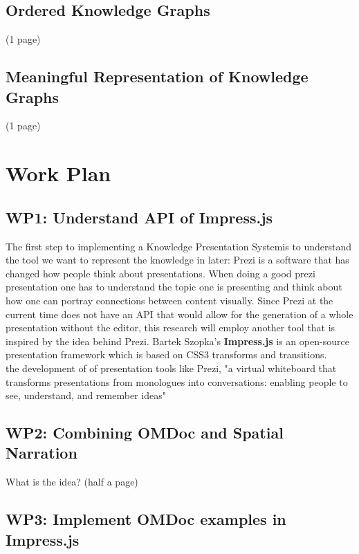 \documentclass[twoside]{article}
\newcommand{\sys}{Knowledge Presentation System}
\begin{document}
\subsection{Ordered Knowledge Graphs}
(1 page)
\newpage

\subsection{Meaningful Representation of Knowledge Graphs}
(1 page)

\newpage

\section{Work Plan}
\subsection{WP1: Understand API of Impress.js}

The first step to implementing a \sys is to understand the tool we want to represent the knowledge in later: Prezi is a software that has changed how people think about presentations. When doing a good prezi presentation one has to understand the topic one is presenting and think about how one can portray connections between content visually. Since Prezi at the current time does not have an API that would allow for the generation of a whole presentation without the editor, this research will employ another tool that is inspired by the idea behind Prezi. Bartek Szopka's \textbf{Impress.js} is an open-source presentation framework which is based on CSS3 transforms and transitions.\cite{Impress}\\

the development of of presentation tools like Prezi,  "a virtual whiteboard that transforms presentations from monologues into conversations: enabling people to see, understand, and remember ideas"\cite{Prezi}

\subsection{WP2: Combining OMDoc and Spatial Narration}

What is the idea?
(half a page)
\newpage

\subsection{WP3: Implement OMDoc examples in Impress.js}
\newpage
\end{document}

